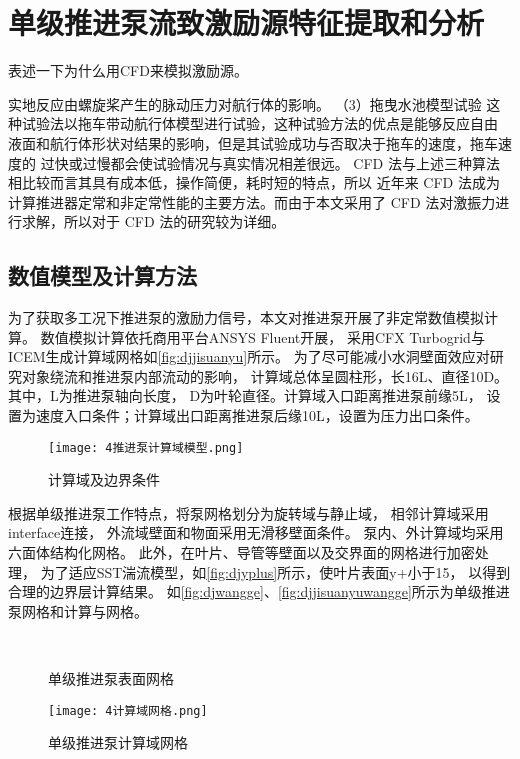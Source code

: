 \section{单级推进泵流致激励源特征提取和分析}
表述一下为什么用CFD来模拟激励源。

实地反应由螺旋桨产生的脉动压力对航行体的影响。 
（3）拖曳水池模型试验 
这种试验法以拖车带动航行体模型进行试验，这种试验方法的优点是能够反应自由
液面和航行体形状对结果的影响，但是其试验成功与否取决于拖车的速度，拖车速度的
过快或过慢都会使试验情况与真实情况相差很远。 
CFD 法与上述三种算法相比较而言其具有成本低，操作简便，耗时短的特点，所以
近年来 CFD 法成为计算推进器定常和非定常性能的主要方法。而由于本文采用了 CFD
法对激振力进行求解，所以对于 CFD 法的研究较为详细。
\subsection{数值模型及计算方法}
为了获取多工况下推进泵的激励力信号，本文对推进泵开展了非定常数值模拟计算。
数值模拟计算依托商用平台ANSYS Fluent开展，
采用CFX Turbogrid与ICEM生成计算域网格如\autoref{fig:djjisuanyu}所示。
为了尽可能减小水洞壁面效应对研究对象绕流和推进泵内部流动的影响，
计算域总体呈圆柱形，长16L、直径10D。其中，L为推进泵轴向长度，
D为叶轮直径。计算域入口距离推进泵前缘5L，
设置为速度入口条件；计算域出口距离推进泵后缘10L，设置为压力出口条件。
\begin{figure}[htbp]
    \centering
    \texttt{[image: 4推进泵计算域模型.png]}
    \caption{\label{fig:djjisuanyu}计算域及边界条件}
\end{figure}

根据单级推进泵工作特点，将泵网格划分为旋转域与静止域，
相邻计算域采用interface连接，
外流域壁面和物面采用无滑移壁面条件。
泵内、外计算域均采用六面体结构化网格。
此外，在叶片、导管等壁面以及交界面的网格进行加密处理，
为了适应SST湍流模型，如\autoref{fig:djyplus}所示，使叶片表面y+小于15，
以得到合理的边界层计算结果。
如\autoref{fig:djwangge}、\autoref{fig:djjisuanyuwangge}所示为单级推进泵网格和计算与网格。
\begin{figure}[htbp]
    \centering
    \vspace{0.02cm}
    \caption{\label{fig:djwangge}单级推进泵表面网格}
\end{figure}

\begin{figure}[htbp]
    \centering
    \texttt{[image: 4计算域网格.png]}
    \caption{\label{fig:djjisuanyuwangge}单级推进泵计算域网格}
\end{figure}

